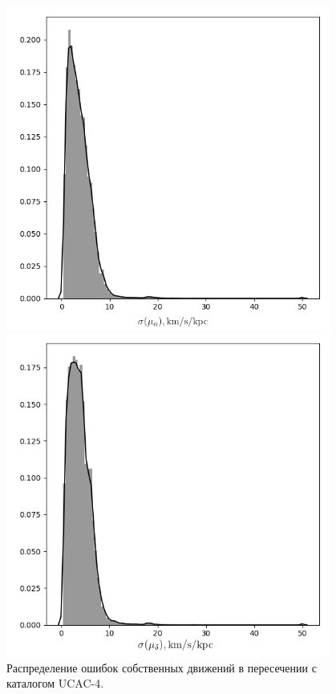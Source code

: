 \documentclass{matmex-diploma-custom}
\begin{document}
\begin{figure}[h!]
\begin{minipage}[h]{0.49\linewidth}
        \includegraphics[width=0.95\textwidth]{../imgs/pm_ra_err_distr.png}
\end{minipage}
\hfill
\begin{minipage}[h]{0.49\linewidth}
        \includegraphics[width=0.95\textwidth]{../imgs/pm_dec_err_distr.png}
\end{minipage}
\caption{Распределение ошибок собственных движений в пересечении с каталогом UCAC-4.}
\end{figure}
\end{document}
